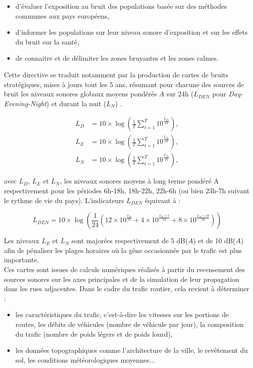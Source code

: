 \begin{itemize}
	\item d'évaluer l'exposition au bruit des populations basée sur des méthodes communes aux pays européens,
	\item d'informer les populations sur leur niveau sonore d'exposition et sur les effets du bruit sur la santé,
	\item de connaitre et de délimiter les zones bruyantes et les zones calmes.\\
\end{itemize}

Cette directive se traduit notamment par la production de cartes de bruits stratégiques, mises à jours tout les 5 ans, résumant pour chacune des sources de bruit les niveaux sonores globaux moyens pondérés $A$ sur 24h ($L_{DEN}$ pour \textit{Day-Evening-Night}) et durant la nuit ($L_N$) . 


\begin{align}
L_D &= 10\times\log\left(\frac{1}{T} \sum_{t = 1}^{T}10^{\frac{L_{D_t}}{10}}\right),\\
L_E &= 10\times\log\left(\frac{1}{T} \sum_{t = 1}^{T}10^{\frac{L_{E_t}}{10}}\right),\\
L_N &= 10\times\log\left(\frac{1}{T} \sum_{t = 1}^{T}10^{\frac{L_{N_t}}{10}}\right),
\end{align}

avec $L_D$, $L_E$ et $L_N$, les niveaux sonores moyens à long terme pondéré A respectivement pour les périodes 6h-18h, 18h-22h, 22h-6h (ou bien 23h-7h suivant le rythme de vie du pays). L'indicateurs $L_{DEN}$ équivaut à : 

\begin{equation}
L_{DEN} = 10\times\log \left(\frac{1}{24} \left(12\times10^{\frac{L_D}{10}}+4\times10^{\frac{L_E+5}{10}}+8\times10^{\frac{L_N+10}{10}} \right)\right)
\end{equation}

Les niveaux $L_E$ et $L_N$ sont majorées respectivement de 5 dB($A$) et de 10 dB($A$) afin de pénaliser les plages horaires où la gêne occasionnée par le trafic est plus importante. \\

Ces cartes sont issues de calculs numériques réalisés à partir du recensement des sources sonores sur les axes principales et de la simulation de leur propagation dans les rues adjacentes.  Dans le cadre du trafic routier, cela revient à déterminer : 
\begin{itemize}
\item les caractéristiques du trafic, c'est-à-dire les vitesses sur les portions de routes, les débits de véhicules (nombre de véhicule par jour), la composition du trafic  (nombre de poids légers et de poids lourd),
\item les données topographiques comme l'architecture de la ville, le revêtement du sol, les conditions météorologiques moyennes...\\
\end{itemize}

